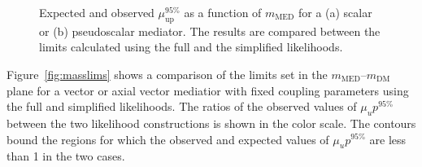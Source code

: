 \begin{figure}[hbt!]
  \begin{center} 
   \caption{Expected and observed $\mu_{\mathrm{up}}^{95\%}$ as a function of $m_{\mathrm{MED}}$ for a (a) scalar or (b) pseudoscalar mediator. The results 
   are compared between the limits calculated using the full and the simplified likelihoods.}
   \label{fig:mulims} 
  \end{center}
\end{figure}


Figure~\ref{fig:masslims} shows a comparison of the limits set in the $m_{\mathrm{MED}}$--$m_{\mathrm{DM}}$ plane for a vector or axial vector mediatior with 
fixed coupling parameters using the full and simplified likelihoods. The ratios of the observed values of 
$\mu_up^{95\%}$ between the two likelihood constructions is shown in the color scale. The contours bound the regions for which the observed and expected values of 
$\mu_up^{95\%}$ are less than 1 in the two cases.



